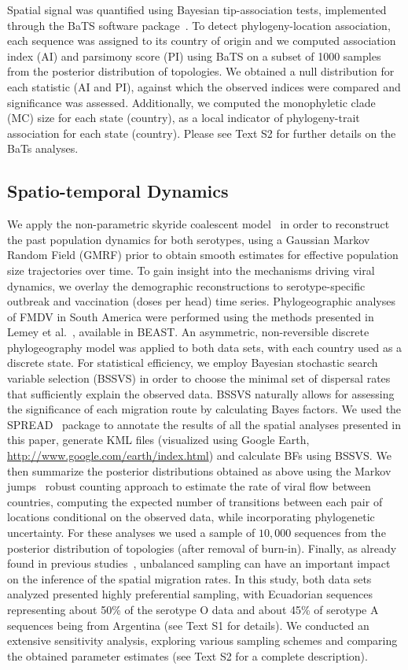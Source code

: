 \documentclass[10pt]{article}
\begin{document}
Spatial signal was quantified using Bayesian tip-association tests, implemented through the BaTS software package~\cite{bats}.
To detect phylogeny-location association, each sequence was assigned to its country of origin and we computed association index (AI) and parsimony score (PI) using BaTS on  a subset of 1000 samples from the posterior distribution of topologies.
We obtained a null distribution for each statistic (AI and PI), against which the observed indices were compared and significance was assessed.
Additionally, we computed the monophyletic clade (MC) size for each state (country), as a local indicator of phylogeny-trait association for each state (country).
Please see Text S2 for further details on the BaTs analyses.

\subsection*{Spatio-temporal Dynamics}

We apply the non-parametric skyride coalescent model~\cite{skyride} in order to reconstruct the past population dynamics for both serotypes, using a Gaussian Markov Random Field (GMRF) prior to obtain smooth estimates for effective population size trajectories over time.
To gain insight into the mechanisms driving viral dynamics, we overlay the demographic reconstructions to serotype-specific outbreak and vaccination (doses per head) time series.
Phylogeographic analyses of FMDV in South America were performed using the methods presented in Lemey et al.~\cite{roots}, available in BEAST. 
An asymmetric, non-reversible discrete phylogeography model was applied to both data sets, with each country used as a discrete state.
For statistical efficiency, we employ Bayesian stochastic search variable selection (BSSVS) in order to choose the minimal set of dispersal rates that sufficiently explain the observed data.
BSSVS naturally allows for assessing the significance of each migration route by calculating Bayes factors.
We used the SPREAD~\cite{spread} package to annotate the results of all the spatial analyses presented in this paper, generate KML files (visualized using Google Earth, \url{http://www.google.com/earth/index.html}) and calculate BFs using BSSVS.
We then summarize the posterior distributions obtained as above using the Markov jumps~\cite{Minin2008} robust counting approach to estimate the rate of viral flow between countries, computing the expected number of transitions between each pair of locations conditional on the observed data, while incorporating phylogenetic uncertainty.
For these analyses we used a sample of $10,000$ sequences from the posterior distribution of topologies (after removal of burn-in). 
Finally, as already found in previous studies~\cite{Faria2012, Lemey2014}, unbalanced sampling can have an important impact on the inference of the spatial migration rates.
In this study, both data sets analyzed presented highly preferential sampling, with Ecuadorian sequences representing about 50\% of the serotype O data and about 45\% of serotype A sequences being from Argentina (see Text S1 for details).
We conducted an extensive sensitivity analysis, exploring various sampling schemes and comparing the obtained parameter estimates (see Text S2 for a complete description).
\end{document}
